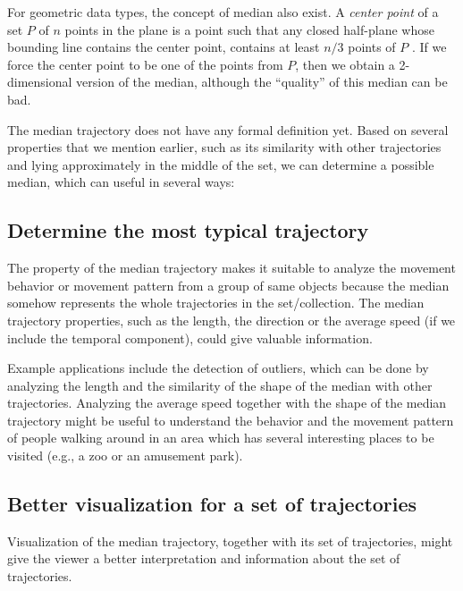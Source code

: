 For geometric data types, the concept of median also exist.
A \textit{center point} of a set $P$ of $n$ points in the plane is a point such that any closed half-plane whose bounding line contains the center point, contains at least $n/3$ points of $P$ \cite{Amenta:2000}.
If we force the center point to be one of the points from $P$, then we obtain a 2-dimensional version of the median, although the ``quality'' of this median can be bad.

The median trajectory does not have any formal definition yet.
Based on several properties that we mention earlier, such as its similarity with other trajectories and lying approximately in the middle of the set, we can determine a possible median, which can useful in several ways:

\subsection{Determine the most typical trajectory}
The property of the median trajectory makes it suitable to analyze the movement behavior or movement pattern from a group of same objects because the median somehow represents the whole trajectories in the set/collection.
The median trajectory properties, such as the length, the direction or the average speed (if we include the temporal component), could give valuable information.

Example applications include the detection of outliers, which can be done by analyzing the length and the similarity of the shape of the median with other trajectories.
Analyzing the average speed together with the shape of the median trajectory might be useful to understand the behavior and the movement pattern of people walking around in an area which has several interesting places to be visited (e.g., a zoo or an amusement park). 

\subsection{Better visualization for a set of trajectories}
Visualization of the median trajectory, together with its set of trajectories, might give the viewer a better interpretation and information about the set of trajectories.

